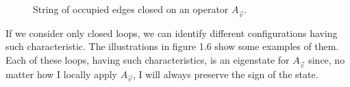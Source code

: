 \documentclass{Configuration_Files/PoliMi3i_thesis}
\begin{document}
\begin{figure}
\begin{center}
\end{center}

\caption{String of occupied edges closed on an operator $A_{\vec{v}} $.}
\label{fig:Aveigen}
\end{figure}
		


If we consider only closed loops, we can identify different configurations having such characteristic. The illustrations in figure 1.6 show some examples of them.
Each of these loops, having such characteristics, is an eigenstate for $A_{\vec{v}} $ since, no matter how I locally apply $A_{\vec{v}} $, I will always preserve the sign of the state. 

\end{document}
